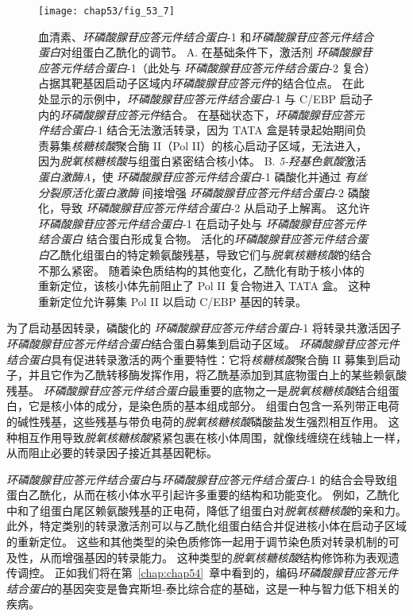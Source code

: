\begin{figure}[htbp]
	\centering
	\texttt{[image: chap53/fig\_53\_7]}
	\caption{血清素、\textit{环磷酸腺苷应答元件结合蛋白}-1 和\textit{环磷酸腺苷应答元件结合蛋白}对组蛋白乙酰化的调节。 
		A. 在基础条件下，激活剂 \textit{环磷酸腺苷应答元件结合蛋白}-1（此处与 \textit{环磷酸腺苷应答元件结合蛋白}-2 复合）占据其靶基因启动子区域内\textit{环磷酸腺苷应答元件}的结合位点。
		在此处显示的示例中，\textit{环磷酸腺苷应答元件结合蛋白}-1 与 C/EBP 启动子内的\textit{环磷酸腺苷应答元件}结合。
		在基础状态下，\textit{环磷酸腺苷应答元件结合蛋白}-1 结合无法激活转录，因为 TATA 盒是转录起始期间负责募集\textit{核糖核酸}聚合酶 II（Pol II）的核心启动子区域，无法进入，因为\textit{脱氧核糖核酸}与组蛋白紧密结合核小体。
		B. \textit{5-羟基色氨酸}激活\textit{蛋白激酶A}，使 \textit{环磷酸腺苷应答元件结合蛋白}-1 磷酸化并通过 \textit{有丝分裂原活化蛋白激酶} 间接增强 \textit{环磷酸腺苷应答元件结合蛋白}-2 磷酸化，导致 \textit{环磷酸腺苷应答元件结合蛋白}-2 从启动子上解离。
		这允许 \textit{环磷酸腺苷应答元件结合蛋白}-1 在启动子处与 \textit{环磷酸腺苷应答元件结合蛋白} 结合蛋白形成复合物。
		活化的\textit{环磷酸腺苷应答元件结合蛋白}乙酰化组蛋白的特定赖氨酸残基，导致它们与\textit{脱氧核糖核酸}的结合不那么紧密。
		随着染色质结构的其他变化，乙酰化有助于核小体的重新定位，该核小体先前阻止了 Pol II 复合物进入 TATA 盒。
		这种重新定位允许募集 Pol II 以启动 C/EBP 基因的转录。}
	\label{fig:53_7}
\end{figure}


为了启动基因转录，磷酸化的 \textit{环磷酸腺苷应答元件结合蛋白}-1 将转录共激活因子\textit{环磷酸腺苷应答元件结合蛋白}结合蛋白募集到启动子区域。
\textit{环磷酸腺苷应答元件结合蛋白}具有促进转录激活的两个重要特性：它将\textit{核糖核酸}聚合酶 II 募集到启动子，并且它作为乙酰转移酶发挥作用，将乙酰基添加到其底物蛋白上的某些赖氨酸残基。
\textit{环磷酸腺苷应答元件结合蛋白}最重要的底物之一是\textit{脱氧核糖核酸}结合组蛋白，它是核小体的成分，是染色质的基本组成部分。
组蛋白包含一系列带正电荷的碱性残基，这些残基与带负电荷的\textit{脱氧核糖核酸}磷酸盐发生强烈相互作用。
这种相互作用导致\textit{脱氧核糖核酸}紧紧包裹在核小体周围，就像线缠绕在线轴上一样，从而阻止必要的转录因子接近其基因靶标。


\textit{环磷酸腺苷应答元件结合蛋白}与\textit{环磷酸腺苷应答元件结合蛋白}-1 的结合会导致组蛋白乙酰化，从而在核小体水平引起许多重要的结构和功能变化。
例如，乙酰化中和了组蛋白尾区赖氨酸残基的正电荷，降低了组蛋白对\textit{脱氧核糖核酸}的亲和力。
此外，特定类别的转录激活剂可以与乙酰化组蛋白结合并促进核小体在启动子区域的重新定位。 这些和其他类型的染色质修饰一起用于调节染色质对转录机制的可及性，从而增强基因的转录能力。
这种类型的\textit{脱氧核糖核酸}结构修饰称为表观遗传调控。
正如我们将在第~\ref{chap:chap54}~章中看到的，编码\textit{环磷酸腺苷应答元件结合蛋白}的基因突变是鲁宾斯坦-泰比综合症的基础，这是一种与智力低下相关的疾病。


